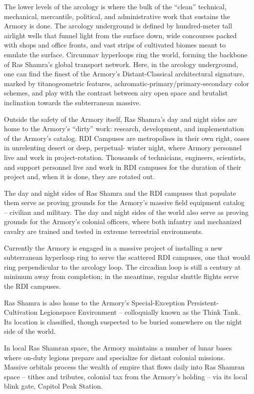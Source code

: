 The lower levels of the arcology is where the bulk of the ``clean'' technical, mechanical, mercantile,
political, and administrative work that sustains the Armory is done. The arcology underground is
defined by hundred-meter tall airlight wells that funnel light from the surface down, wide
concourses packed with shops and office fronts, and vast strips of cultivated biomes meant to
emulate the surface. Circumnav hyperloops ring the world, forming the backbone of Ras
Shamra’s global transport network. Here, in the arcology underground, one can find the finest of
the Armory’s Distant-Classical architectural signature, marked by titanogeometric features,
achromatic-primary/primary-secondary color schemes, and play with the contrast between airy
open space and brutalist inclination towards the subterranean massive.

Outside the safety of the Armory itself, Ras Shamra’s day and night sides are home to the
Armory’s ``dirty'' work: research, development, and implementation of the Armory’s catalog. RDI
Campuses are metropolises in their own right, oases in unrelenting desert or deep, perpetual-
winter night, where Armory personnel live and work in project-rotation. Thousands of technicians,
engineers, scientists, and support personnel live and work in RDI campuses for the duration of
their project and, when it is done, they are rotated out.

The day and night sides of Ras Shamra and the RDI campuses that populate them serve as
proving grounds for the Armory’s massive field equipment catalog -- civilian and military. The day
and night sides of the world also serve as proving grounds for the Armory’s colonial officers,
where both infantry and mechanized cavalry are trained and tested in extreme terrestrial
environments.

Currently the Armory is engaged in a massive project of installing a new subterranean hyperloop
ring to serve the scattered RDI campuses, one that would ring perpendicular to the arcology loop.
The circadian loop is still a century at minimum away from completion; in the meantime, regular
shuttle flights serve the RDI campuses.

Ras Shamra is also home to the Armory’s Special-Exception Persistent-Cultivation Legionspace
Environment -- colloquially known as the Think Tank. Its location is classified, though suspected to
be buried somewhere on the night side of the world.

In local Ras Shamran space, the Armory maintains a number of lunar bases where on-duty
legions prepare and specialize for distant colonial missions. Massive orbitals process the wealth
of empire that flows daily into Ras Shamran space -- tithes and tributes, colonial tax from the
Armory’s holding -- via its local blink gate, Capitol Peak Station.

